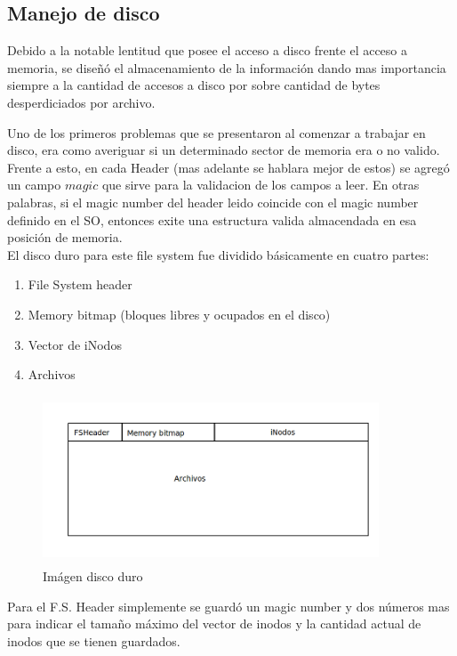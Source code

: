 \documentclass[english]{article}
\begin{document}
\subsection{Manejo de disco}

Debido a la notable lentitud que posee el acceso a disco frente el
acceso a memoria, se diseñó el almacenamiento de la información dando
mas importancia siempre a la cantidad de accesos a disco por sobre
cantidad de bytes desperdiciados por archivo.

Uno de los primeros problemas que se presentaron al comenzar a trabajar
en disco, era como averiguar si un determinado sector de memoria era
o no valido. Frente a esto, en cada Header (mas adelante se hablara
mejor de estos) se agregó un campo $magic$ que sirve para la validacion
de los campos a leer. En otras palabras, si el magic number del header
leido coincide con el magic number definido en el SO, entonces exite
una estructura valida almacendada en esa posición de memoria. \\


El disco duro para este file system fue dividido básicamente en cuatro
partes:
\begin{enumerate}
\item File System header
\item Memory bitmap (bloques libres y ocupados en el disco)
\item Vector de iNodos
\item Archivos
\end{enumerate}

\begin{figure}[H]
\begin{center}
\includegraphics[width=10cm,height=5cm,keepaspectratio]{Imagen_disco}

\caption{Imágen disco duro}
\end{center}
\end{figure}


Para el F.S. Header simplemente se guardó un magic number y dos números
mas para indicar el tamaño máximo del vector de inodos y la cantidad
actual de inodos que se tienen guardados.
\end{document}
